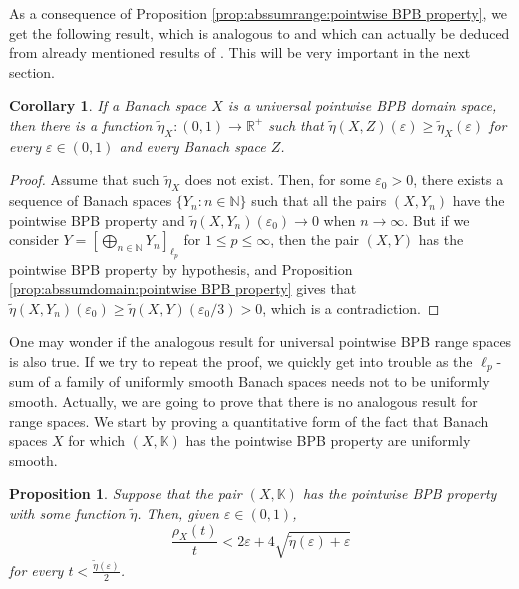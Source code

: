 \documentclass[a4paper,10pt]{amsart}
\theoremstyle{plain}
\newtheorem{corollary}[theorem]{Corollary}
\newtheorem{proposition}[theorem]{Proposition}
\theoremstyle{definition}
\newcommand{\K}{\mathbb{K}}
\newcommand{\R}{\mathbb{R}}
\newcommand{\N}{\mathbb{N}}
\newcommand{\eps}{\varepsilon}
\renewcommand{\geq}{\geqslant}
\renewcommand{\leq}{\leqslant}
\begin{document}
As a consequence of Proposition \ref{prop:abssumrange:pointwise BPB property}, we get the following result, which is analogous to \cite[Corollary 2.2]{ACKLM} and which can actually be deduced from already mentioned results of \cite{DKL}. This will be very important in the next section.

\begin{corollary}\label{corollary:universal-eta}
If a Banach space $X$ is a universal pointwise BPB domain space, then there is a function $\tilde\eta_X: (0, 1) \longrightarrow \R^+$ such that $\tilde\eta(X, Z)(\eps)\geq \tilde\eta_X(\eps)$ for every $\eps\in (0,1)$ and every Banach space $Z$.
\end{corollary}

\begin{proof}
Assume that such $\tilde\eta_X$ does not exist. Then, for some $\eps_0 > 0$, there exists a sequence of  Banach spaces $\{Y_n\colon n\in \N \}$ such that all the pairs $(X, Y_n)$ have the pointwise BPB property and $\tilde\eta(X, Y_n)(\eps_0) \longrightarrow 0$ when $n \longrightarrow \infty$. But if we consider $Y = \left[\bigoplus_{n \in \N} Y_n \right]_{\ell_p}$ for $1\leq p\leq \infty$, then the pair $(X, Y)$ has the pointwise BPB property by hypothesis, and Proposition \ref{prop:abssumdomain:pointwise BPB property} gives that $\tilde\eta(X, Y_n)(\eps_0) \geq \tilde\eta(X, Y)(\eps_0/3) > 0$, which is a contradiction.
\end{proof}

One may wonder if the analogous result for universal pointwise BPB range spaces is also true. If we try to repeat the proof, we quickly get into trouble as the $\ell_p$-sum of a family of uniformly smooth Banach spaces needs not to be uniformly smooth. Actually, we are going to prove that there is no analogous result for range spaces. We start by proving a quantitative form of the fact that Banach spaces $X$ for which $(X,\K)$ has the pointwise BPB property are uniformly smooth.

\begin{proposition} \label{pointwise BPB property:modulussmooth} Suppose that the pair $(X, \K)$ has the pointwise BPB property with some function $\tilde\eta$. Then, given $\eps\in (0,1)$,
\begin{equation*}
\frac{\rho_X(t)}{t} <2\eps + 4 \sqrt{\tilde\eta(\eps)+\eps}	
\end{equation*}
for every $t < \frac{\tilde\eta(\eps)}{2}$.
\end{proposition}
\end{document}
